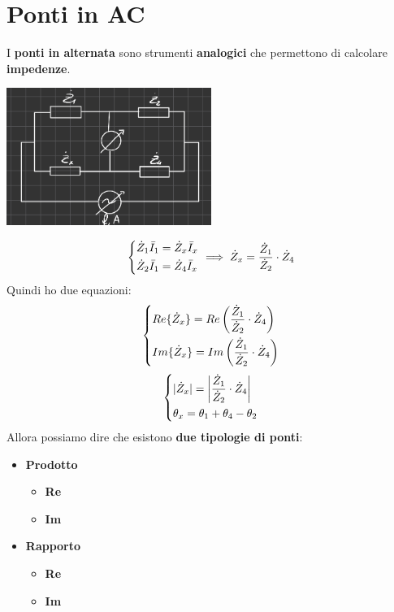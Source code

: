  \chapter{Ponti in AC}
 I \textbf{ponti in alternata} sono strumenti \textbf{analogici} che permettono di calcolare \textbf{impedenze}.
  \begin{center}
    \includegraphics[width=0.50\textwidth]{Images/figure31.png}
  \end{center}
\begin{equation*}
\begin{dcases}
    \dot{Z}_1 \bar{I}_1 =  \dot{Z}_x \bar{I}_x\\
    \dot{Z}_2 \bar{I}_1 =  \dot{Z}_4 \bar{I}_x
\end{dcases}
\implies \dot{Z}_x = \frac{\dot{Z}_1}{\dot{Z}_2} \cdot \dot{Z}_4
\end{equation*}
Quindi ho due equazioni:
\begin{equation*}
\begin{dcases}
    Re\{\dot{Z}_x\} = Re\left(\frac{\dot{Z}_1}{\dot{Z}_2} \cdot \dot{Z}_4\right)\\
    Im\{\dot{Z}_x\} = Im\left(\frac{\dot{Z}_1}{\dot{Z}_2} \cdot \dot{Z}_4\right)
\end{dcases}
\end{equation*}
\begin{equation*}
\begin{dcases}
    |\dot{Z}_x| = \left| \frac{\dot{Z}_1}{\dot{Z}_2} \cdot \dot{Z}_4\right|\\
    \theta_x = \theta_1 + \theta_4 - \theta_2
\end{dcases}
\end{equation*}
Allora possiamo dire che esistono \textbf{due tipologie di ponti}:
\begin{itemize}
    \item \textbf{Prodotto}
    \begin{itemize}
        \item \textbf{Re}
        \item \textbf{Im}
    \end{itemize}
    \item \textbf{Rapporto}
    \begin{itemize}
        \item \textbf{Re}
        \item \textbf{Im}
    \end{itemize}
\end{itemize}
